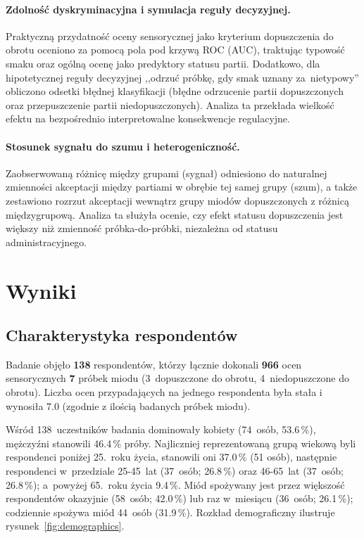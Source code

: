 \paragraph{Zdolność dyskryminacyjna i symulacja reguły decyzyjnej.}
Praktyczną przydatność oceny sensorycznej jako kryterium dopuszczenia do
obrotu oceniono za pomocą pola pod krzywą ROC (AUC), traktując typowość
smaku oraz ogólną ocenę jako predyktory statusu partii. Dodatkowo, dla
hipotetycznej reguły decyzyjnej ,,odrzuć próbkę, gdy smak uznany za~nietypowy''
obliczono odsetki błędnej klasyfikacji (błędne odrzucenie partii
dopuszczonych oraz przepuszczenie partii niedopuszczonych). Analiza ta
przekłada wielkość efektu na bezpośrednio interpretowalne konsekwencje
regulacyjne.


\paragraph{Stosunek sygnału do szumu i heterogeniczność.}
Zaobserwowaną różnicę między grupami (sygnał) odniesiono do naturalnej
zmienności akceptacji między partiami w obrębie tej samej grupy (szum),
a także zestawiono rozrzut akceptacji wewnątrz grupy miodów dopuszczonych
z różnicą międzygrupową. Analiza ta służyła ocenie, czy efekt statusu
dopuszczenia jest większy niż zmienność próbka-do-próbki, niezależna od
statusu administracyjnego.

\section{Wyniki}

\subsection{Charakterystyka respondentów}
Badanie objęło \textbf{138} respondentów, którzy łącznie
dokonali \textbf{966} ocen sensorycznych \textbf{7} próbek
miodu (3~dopuszczone do obrotu, 4~niedopuszczone
do obrotu).
Liczba ocen przypadających na jednego respondenta była stała i wynosiła 7.0 (zgodnie z ilością badanych próbek miodu).


Wśród 138~uczestników badania dominowały kobiety
(74~osób, 53.6\,\%), mężczyźni stanowili
46.4\,\% próby.
Najliczniej reprezentowaną grupą wiekową byli respondenci poniżej 25.~roku
życia, stanowili oni 37.0\,\% (51 osób), następnie respondenci w~przedziale 25-45~lat (37~osób; 26.8\,\%) oraz 46-65~lat
(37~osób; 26.8\,\%);  a~powyżej 65.~roku
życia 9.4\,\%.
Miód spożywany jest przez większość respondentów okazyjnie
(58~osób; 42.0\,\%)
lub raz w~miesiącu (36~osób; 26.1\,\%);
codziennie spożywa miód 44~osób (31.9\,\%).
Rozkład demograficzny ilustruje rysunek~\ref{fig:demographics}.

